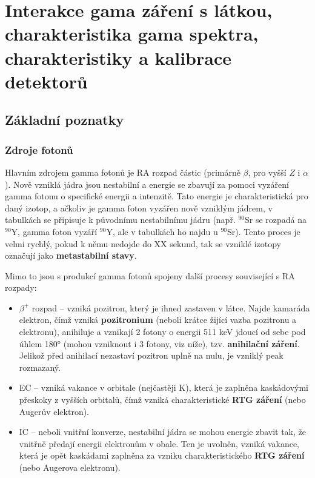 \section[Interakce gamma záření]{Interakce gama záření s látkou, charakteristika gama spektra, charakteristiky a kalibrace detektorů}

\subsection{Základní poznatky}

\subsubsection{Zdroje fotonů}

Hlavním zdrojem gamma fotonů je RA rozpad částic (primárně $\beta$, pro vyšší $Z$ i $\alpha$). Nově vzniklá jádra jsou nestabilní a energie se zbavují za pomoci vyzáření gamma fotonu o specifické energii a intenzitě. Tato energie je charakteristická pro daný izotop, a ačkoliv je gamma foton vyzářen nově vzniklým jádrem, v tabulkách se připisuje k původnímu nestabilnímu jádru (např. $^{90}$Sr se rozpadá na $^{90}$Y, gamma foton vyzáří $^{90}$Y, ale v tabulkách ho najdu u $^{90}$Sr). Tento proces je velmi rychlý, pokud k němu nedojde do XX sekund, tak se vzniklé izotopy označují jako \textbf{metastabilní stavy}.

Mimo to jsou s produkcí gamma fotonů spojeny další procesy související s RA rozpady:

\begin{itemize}
    \item $\beta^+$ rozpad -- vzniká pozitron, který je ihned zastaven v látce. Najde kamaráda elektron, čímž vzniká \textbf{pozitronium} (neboli krátce žijící vazba pozitronu a elektronu), anihiluje a vznikají 2 fotony o energii 511 keV jdoucí od sebe pod úhlem 180° (mohou vzniknout i 3 fotony, viz níže), tzv. \textbf{anihilační záření}. Jelikož před anihilací nezastaví pozitron uplně na nulu, je vzniklý peak rozmazaný.
    \item EC -- vzniká vakance v orbitale (nejčastěji K), která je zaplněna kaskádovými přeskoky z vyšších orbitalů, čímž vzniká charakteristické \textbf{RTG záření} (nebo Augerův elektron).
    \item IC -- neboli vnitřní konverze, nestabilní jádra se mohou energie zbavit tak, že vnitřně předají energii elektronům v obale. Ten je uvolněn, vzniká vakance, která je opět kaskádami zaplněna za vzniku charakteristického \textbf{RTG záření} (nebo Augerova elektronu).
\end{itemize}

